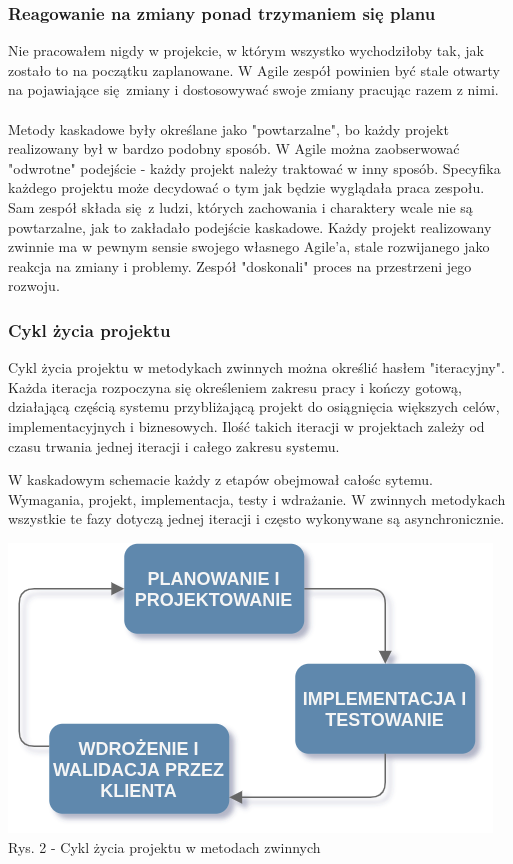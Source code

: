 \documentclass{article}
\begin{document}
\subsubsection*{Reagowanie na zmiany ponad trzymaniem się planu}
Nie pracowałem nigdy w projekcie, w którym wszystko wychodziłoby tak, jak zostało to na początku zaplanowane. W Agile zespół powinien być stale otwarty na pojawiające się zmiany i dostosowywać swoje zmiany pracując razem z nimi.

\paragraph{}
Metody kaskadowe były określane jako "powtarzalne"\cite{scrum}, bo każdy projekt realizowany był w bardzo podobny sposób. W Agile można zaobserwować "odwrotne" podejście - każdy projekt należy traktować w inny sposób. Specyfika każdego projektu może decydować o tym jak będzie wyglądała praca zespołu. Sam zespół składa się z ludzi, których zachowania i charaktery wcale nie są powtarzalne, jak to zakładało podejście kaskadowe. Każdy projekt realizowany zwinnie ma w pewnym sensie swojego własnego Agile'a, stale rozwijanego jako reakcja na zmiany i problemy. Zespół "doskonali" proces na przestrzeni jego rozwoju.

\subsubsection{Cykl życia projektu}
Cykl życia projektu w metodykach zwinnych można określić hasłem "iteracyjny". Każda iteracja rozpoczyna się określeniem zakresu pracy i kończy gotową, działającą częścią systemu przybliżającą projekt do osiągnięcia większych celów, implementacyjnych i biznesowych. Ilość takich iteracji w projektach zależy od czasu trwania jednej iteracji i całego zakresu systemu.

W kaskadowym schemacie każdy z etapów obejmował całośc sytemu. Wymagania, projekt, implementacja, testy i wdrażanie. W zwinnych metodykach wszystkie te fazy dotyczą jednej iteracji i często wykonywane są asynchronicznie.

\begin{center}
    \includegraphics[scale=0.35]{agile.png}
    \newline
    Rys. 2 - Cykl życia projektu w metodach zwinnych
\end{center}
\end{document}
